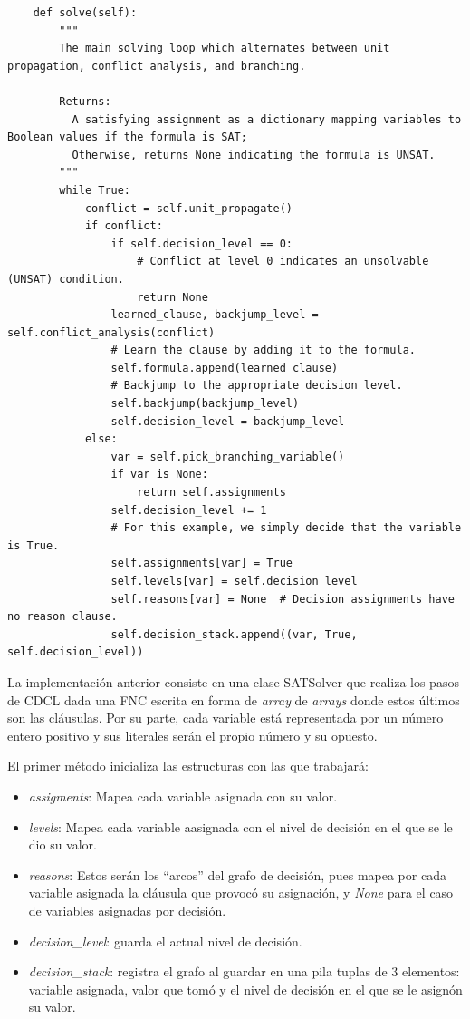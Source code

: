 \begin{lstlisting}
    def solve(self):
        """
        The main solving loop which alternates between unit propagation, conflict analysis, and branching.
        
        Returns:
          A satisfying assignment as a dictionary mapping variables to Boolean values if the formula is SAT;
          Otherwise, returns None indicating the formula is UNSAT.
        """
        while True:
            conflict = self.unit_propagate()
            if conflict:
                if self.decision_level == 0:
                    # Conflict at level 0 indicates an unsolvable (UNSAT) condition.
                    return None
                learned_clause, backjump_level = self.conflict_analysis(conflict)
                # Learn the clause by adding it to the formula.
                self.formula.append(learned_clause)
                # Backjump to the appropriate decision level.
                self.backjump(backjump_level)
                self.decision_level = backjump_level
            else:
                var = self.pick_branching_variable()
                if var is None:
                    return self.assignments
                self.decision_level += 1
                # For this example, we simply decide that the variable is True.
                self.assignments[var] = True
                self.levels[var] = self.decision_level
                self.reasons[var] = None  # Decision assignments have no reason clause.
                self.decision_stack.append((var, True, self.decision_level))
\end{lstlisting}

La implementación anterior consiste en una clase SATSolver que realiza los pasos de CDCL dada una FNC escrita en forma de \textit{array} de \textit{arrays} donde estos últimos son las cláusulas. Por su parte, cada variable está representada por un número entero positivo y sus literales serán el propio número y su opuesto.

El primer método inicializa las estructuras con las que trabajará:
\begin{itemize}
\item \textit{assigments}: Mapea cada variable asignada con su valor.
\item \textit{levels}: Mapea cada variable aasignada con el nivel de decisión en el que se le dio su valor.
\item \textit{reasons}: Estos serán los ``arcos'' del grafo de decisión, pues mapea por cada variable asignada la cláusula que provocó su asignación, y \textit{None} para el caso de variables asignadas por decisión.
\item \textit{decision\_level}: guarda el actual nivel de decisión.
\item \textit{decision\_stack}: registra el grafo al guardar en una pila tuplas de 3 elementos: variable asignada, valor que tomó y el nivel de decisión en el que se le asignón su valor.
\end{itemize}

